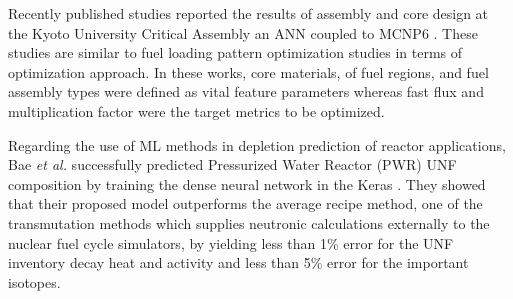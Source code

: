     \DIFaddend Recently published studies \cite{Kim2018, Kim2020} reported the results of \DIFdelbegin {}\DIFdelend \DIFaddbegin {}\DIFaddend assembly and core design at the Kyoto University Critical Assembly \DIFdelbegin {}\DIFdelend \DIFaddbegin {}\DIFaddend an \gls{ANN} coupled to MCNP6 \cite{mcnp2017}. These studies are similar to fuel loading pattern optimization studies in terms of \DIFaddbegin {}\DIFaddend optimization approach. In these works, \DIFdelbegin {}\DIFdelend \DIFaddbegin {}\DIFaddend core materials, \DIFdelbegin {}\DIFdelend \DIFaddbegin {}\DIFaddend of fuel regions, and fuel assembly types were defined as vital feature parameters whereas fast flux and multiplication factor were the target metrics to be optimized.

    Regarding the use of \gls{ML} methods in depletion prediction of reactor applications, Bae \emph{et al.} \cite{Bae2020} successfully predicted Pressurized Water Reactor (PWR) \gls{UNF} composition by training the dense neural network in the Keras \cite{keras2015}. They showed that their proposed model outperforms the average recipe method, one of the transmutation methods which supplies neutronic calculations externally to the nuclear fuel cycle simulators, by yielding less than 1\% error for the \gls{UNF} inventory decay heat and activity and less than 5\% error for the important isotopes.

